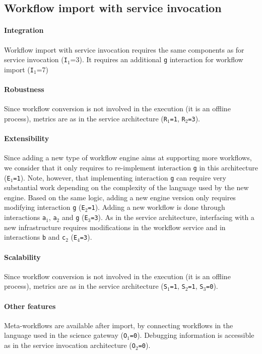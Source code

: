 \documentclass[preprint,3p,twocolumn]{elsarticle}
\begin{document}
\subsection{Workflow import with service invocation}

\paragraph{Integration} Workflow import with service invocation
requires the same components as for service invocation
(\texttt{I$_1$}=3). It requires an additional \texttt{g} interaction
for workflow import (\texttt{I$_1$}=7)

\paragraph{Robustness} Since workflow conversion is not involved in
the execution (it is an offline process), metrics are as in the
service architecture (\texttt{R$_1$=1}, \texttt{R$_2$=3}).

\paragraph{Extensibility} Since adding a new type of workflow engine
aims at supporting more workflows, we consider that it only requires
to re-implement interaction \texttt{g} in this architecture  (\texttt{E$_1$=1}). Note,
however, that implementing interaction \texttt{g} can require very
substantial work depending on the complexity of the language used by
the new engine. Based on the same logic, adding a
new engine version only requires modifying interaction \texttt{g}
(\texttt{E$_2$=1}).  Adding a new workflow is done through
interactions \texttt{a$_1$}, \texttt{a$_2$} and \texttt{g} (\texttt{E$_3$=3}). As in the
service architecture, interfacing with a new infrastructure requires
modifications in the workflow service and in interactions \texttt{b}
and \texttt{c$_2$} (\texttt{E$_4$=3}).

\paragraph{Scalability}  Since workflow conversion is not involved in
the execution (it is an offline process), metrics are as in the
service architecture (\texttt{S$_1$=1},
\texttt{S$_2$=1}, \texttt{S$_3$=0}).

\paragraph{Other features} Meta-workflows are available after import,
by connecting workflows in the language used in the science gateway
(\texttt{O$_1$=0}). Debugging information is accessible as in the
service invocation architecture (\texttt{O$_2$=0}).
\end{document}
